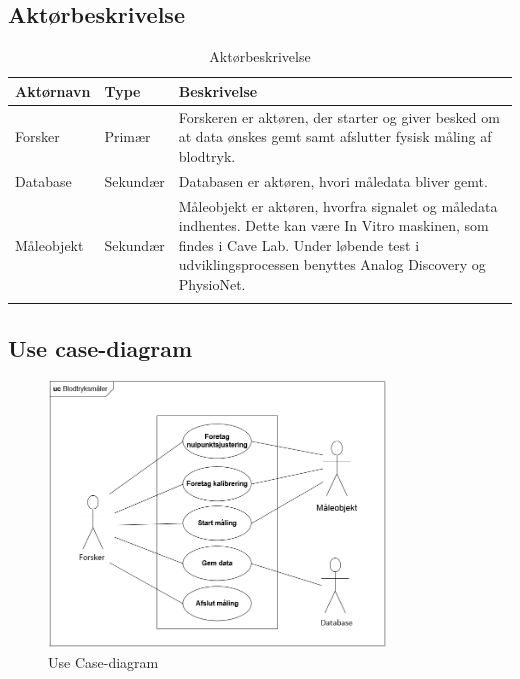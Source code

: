 \subsection{Aktørbeskrivelse}

\begin{table}[H]
\begin{tabularx}{\textwidth}{l l X}
     Aktørnavn	&	Type		&	Beskrivelse \\ \midrule
     Forsker   	& 	Primær  	& 	Forskeren er aktøren, der starter og giver besked om at data ønskes gemt samt afslutter fysisk måling af blodtryk. \\ 			  \addlinespace[2mm]
     Database	&	Sekundær	&	Databasen er aktøren, hvori måledata bliver gemt. \\   \addlinespace[2mm]
     Måleobjekt	&	Sekundær	&	Måleobjekt er aktøren, hvorfra signalet og måledata indhentes. Dette kan være In Vitro maskinen, som findes i Cave Lab. Under løbende test i udviklingsprocessen benyttes Analog Discovery og PhysioNet. \\   \addlinespace[2mm]
     
   
     \bottomrule                                                                                                                   
    \end{tabularx}
    \caption {Aktørbeskrivelse}
    \label{tab:aktoerbeskrivelse}
	
\end{table}

\subsection{Use case-diagram}

\begin{figure}[H]
	\centering
	\includegraphics[width=0.8\textwidth]{Figurer/UseCasediagram}
	\caption{Use Case-diagram}
	\label{fig:Use Cases}
\end{figure}

